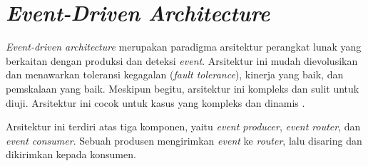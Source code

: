 \section{\textit{Event-Driven Architecture}}

\textit{Event-driven architecture} merupakan paradigma arsitektur perangkat lunak yang berkaitan dengan produksi dan deteksi \textit{event}. Arsitektur ini mudah dievolusikan dan menawarkan toleransi kegagalan (\textit{fault tolerance}), kinerja yang baik, dan pemskalaan yang baik. Meskipun begitu, arsitektur ini kompleks dan sulit untuk diuji. Arsitektur ini cocok untuk kasus yang kompleks dan dinamis \parencite{softwareArchitecture}.

Arsitektur ini terdiri atas tiga komponen, yaitu \textit{event producer}, \textit{event router}, dan \textit{event consumer}. Sebuah produsen mengirimkan \textit{event} ke \textit{router}, lalu disaring dan dikirimkan kepada konsumen.





